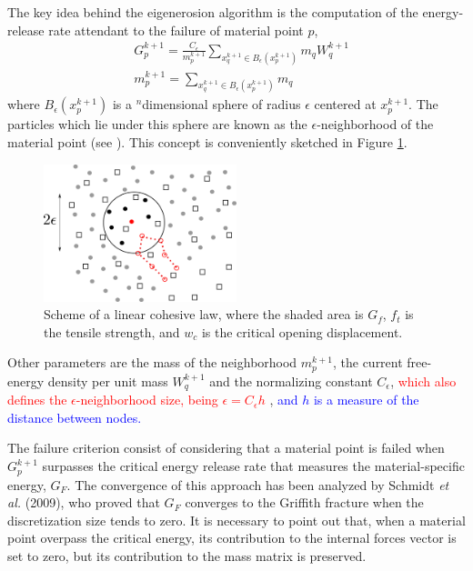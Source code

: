 \message{ !name(2020_EFM_MPM_Eigensoftening.tex)}\documentclass[preprint,12pt,a4paper]{elsarticle}
\newcommand{\PNA}[1]{
  \textcolor{red}{{#1}}
}
\newcommand{\MMP}[1]{
  \textcolor{blue}{{#1}}
}
\begin{document}
The key idea behind the eigenerosion algorithm is the computation of the
energy-release rate attendant to the failure of material point $p$,
\begin{align}
  \label{eq:energy-release-EE}
&G_p^{k+1} = \frac{C_{\epsilon}}{m_p^{k+1}}  \sum_{x_q^{k+1} \in
  B_{\epsilon}(x_p^{k+1})} m_q W_q^{k+1}\\
  \label{eq:mass-EE}
&m_p^{k+1} =  \sum_{x_q^{k+1} \in
  B_{\epsilon}(x_p^{k+1})} m_q  
\end{align}
where $B_{\epsilon}(x_p^{k+1})$ is a $^n$dimensional sphere of radius $\epsilon$
centered at $x_p^{k+1}$. The particles which lie under this sphere are
known as the $\epsilon$-neighborhood of the material point (see
\cite{Pandolfi_2012}). This concept is conveniently sketched in
Figure \ref{fig:Failed-particles}.
\begin{figure}
  \centering
  \includegraphics[width=0.5\textwidth]{Figure-Particle-failed}
  \caption{Scheme of a linear cohesive law, where the shaded area is
    $G_f$, $f_t$ is the tensile strength, and $w_c$ is the critical
    opening displacement.}
  \label{fig:Failed-particles}
\end{figure}
Other parameters are the mass of the neighborhood $m_p^{k+1}$, the
current free-energy density per unit mass  $W_q^{k+1}$ and the
normalizing constant $C_{\epsilon}$, \PNA{which also defines the
  $\epsilon$-neighborhood size, being $\epsilon = C_\epsilon h$}, \MMP{ and
  $h$ is a measure of the distance between nodes.}

The failure criterion consist of considering that a material point is failed
when $G_p^{k+1}$ surpasses the critical energy release rate that
measures the material-specific energy, $G_F$. The convergence of this
approach has been analyzed by Schmidt {\it et al.}
(2009)\cite{Schmidt_2009}, who proved that $G_F$ converges to the Griffith
fracture when the discretization size tends to zero. It is necessary to
point out that, when a material point overpass the critical energy, its
contribution to the internal forces vector is set to zero, but its
contribution to the mass matrix is preserved.\\
\end{document}
